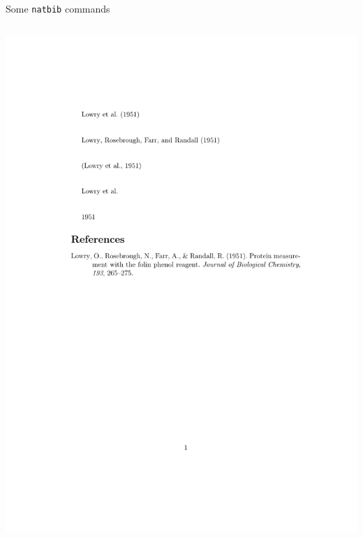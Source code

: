\documentclass[,aspectratio=43]{beamer}
\begin{document}
\begin{frame}[fragile]{Some \texttt{natbib} commands}
\begin{columns}[T]
\begin{column}{0.43\textwidth}
\begin{center}\includegraphics[width=1\linewidth]{figure/natbib} \end{center}
\end{column}
\end{columns}
\end{frame}
\end{document}
